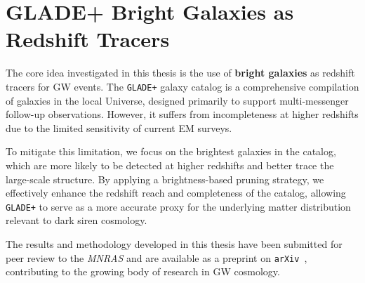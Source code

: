 \chapter{GLADE+ Bright Galaxies as Redshift Tracers}
\label{chap:methodology}

The core idea investigated in this thesis is the use of \textbf{bright galaxies} as redshift tracers for \ac{GW} events. The \texttt{GLADE+} galaxy catalog is a comprehensive compilation of galaxies in the local Universe, designed primarily to support multi-messenger follow-up observations. However, it suffers from incompleteness at higher redshifts due to the limited sensitivity of current \ac{EM} surveys.

To mitigate this limitation, we focus on the brightest galaxies in the catalog, which are more likely to be detected at higher redshifts and better trace the large-scale structure. By applying a brightness-based pruning strategy, we effectively enhance the redshift reach and completeness of the catalog, allowing \texttt{GLADE+} to serve as a more accurate proxy for the underlying matter distribution relevant to dark siren cosmology.

The results and methodology developed in this thesis have been submitted for peer review to the \textit{\ac{MNRAS}} and are available as a preprint on \texttt{arXiv}~\citep{naveed2025dark}, contributing to the growing body of research in \ac{GW} cosmology.

